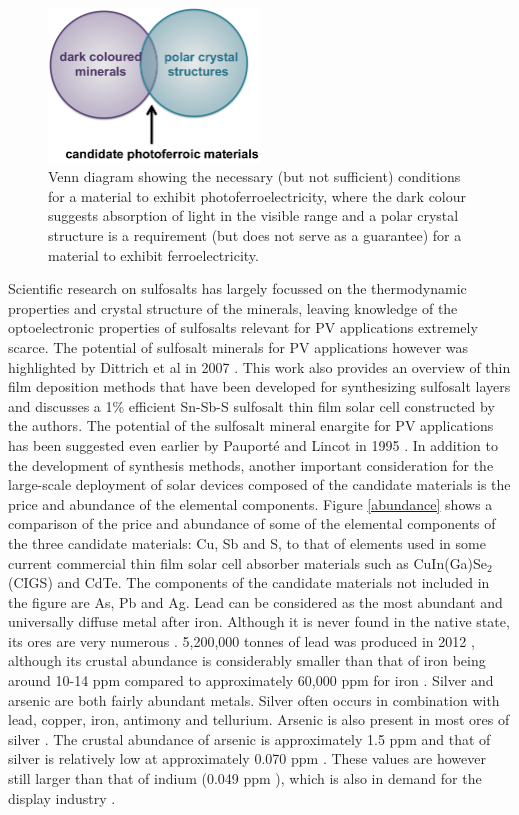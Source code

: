 \begin{figure}[h!]
  \centering
    \includegraphics[width=0.5\textwidth]{figures/venn_diagram.png}
    \caption{Venn diagram showing the necessary (but not sufficient) conditions for a material to exhibit photoferroelectricity, where the dark colour suggests absorption of light in the visible range and a polar crystal structure is a requirement (but does not serve as a guarantee) for a material to exhibit ferroelectricity.}
  \label{vd}
\end{figure}

Scientific research on sulfosalts has largely focussed on the thermodynamic properties and crystal structure of the minerals, leaving knowledge of the optoelectronic properties of sulfosalts relevant for PV applications extremely scarce. 
The potential of sulfosalt minerals for PV applications however was highlighted by Dittrich et al in 2007 \cite{Dittrich2}. This work also provides an overview of thin film deposition methods that have been developed for synthesizing sulfosalt layers and discusses a 1\% efficient Sn-Sb-S sulfosalt thin film solar cell constructed by the authors. The potential of the sulfosalt mineral enargite for PV applications has been suggested even earlier by Pauport\'{e} and Lincot in 1995 \cite{enargite_properties}. In addition to the development of synthesis methods, another important consideration for the large-scale deployment of solar devices composed of the candidate materials is the price and abundance of the elemental components. Figure \ref{abundance} shows a comparison of the price and abundance of some of the elemental components of the three candidate materials: Cu, Sb and S, to that of elements used in some current commercial thin film solar cell absorber materials such as CuIn(Ga)Se$_{2}$ (CIGS) and CdTe. The components of the candidate materials not included in the figure are As, Pb and Ag. Lead can be considered as the most abundant and universally diffuse metal after iron. Although it is never found in the native state, its ores are very numerous \cite{abundance}. 5,200,000 tonnes of lead was produced in 2012 \cite{ab_prod}, although its crustal abundance is considerably smaller than that of iron being around 10-14 ppm compared to approximately 60,000 ppm for iron \cite{ab_1}. 
Silver and arsenic are both fairly abundant metals. Silver often occurs in combination with lead, copper, iron, antimony and tellurium. Arsenic is also present in most ores of silver \cite{abundance}. The crustal abundance of arsenic is approximately 1.5 ppm and that of silver is relatively low at approximately 0.070 ppm \cite{ab_1}. These values are however still larger than that of indium (0.049 ppm \cite{ab_1}), which is also in demand for the display industry \cite{SS}.

